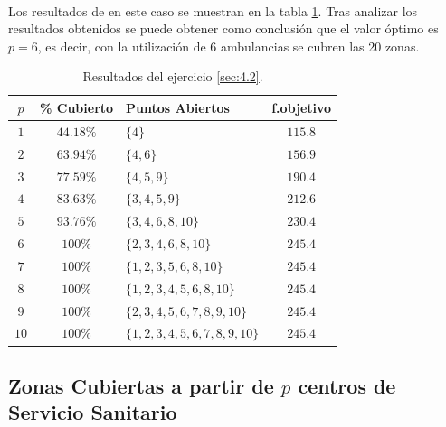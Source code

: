 \documentclass[spanish]{article}
\begin{document}
			\paragraph{}
			Los resultados de en este caso se muestran en la tabla \ref{table:sol-4.2}. Tras analizar los resultados obtenidos se puede obtener como conclusión que el valor óptimo es $p = 6$, es decir, con la utilización de 6 ambulancias se cubren las 20 zonas.


			\begin{table}[h]
				\begin{center}
					\begin{tabular}{|c || c || l || c | }
						\hline
						$p$		&	\% Cubierto	& Puntos Abiertos 					& f.objetivo \\ \hline \hline
						$1$ 	& $44.18\%$ & $\{4\}$ 										& $115.8$ \\ \hline
		     		$2$ 	& $63.94\%$ & $\{4, 6\}$									& $156.9$ \\ \hline
						$3$ 	& $77.59\%$ & $\{4,5,9\}$ 								& $190.4$ \\ \hline
						$4$ 	& $83.63\%$ & $\{3,4,5,9\}$ 							& $212.6$ \\ \hline
						$5$ 	& $93.76\%$ & $\{3,4,6,8,10\}$ 						& $230.4$ \\ \hline
						$6$ 	& $100\%$ 	& $\{2,3,4,6,8,10\}$					& $245.4$ \\ \hline
						$7$ 	& $100\%$ 	& $\{1,2,3,5,6,8,10 \}$				& $245.4$ \\ \hline
						$8$ 	& $100\%$ 	& $\{1,2,3,4,5,6,8,10\}$			& $245.4$ \\ \hline
						$9$ 	& $100\%$ 	& $\{2,3,4,5,6,7,8,9,10\}$ 		& $245.4$ \\ \hline
						$10$	& $100\%$ 	& $\{1,2,3,4,5,6,7,8,9,10\}$	& $245.4$ \\
						\hline
					\end{tabular}
				\end{center}
				\caption{Resultados del ejercicio \ref{sec:4.2}.}
				\label{table:sol-4.2}
			\end{table}


		\subsection{Zonas Cubiertas a partir de $p$ centros de Servicio Sanitario}
		\label{sec:4.3}
\end{document}
